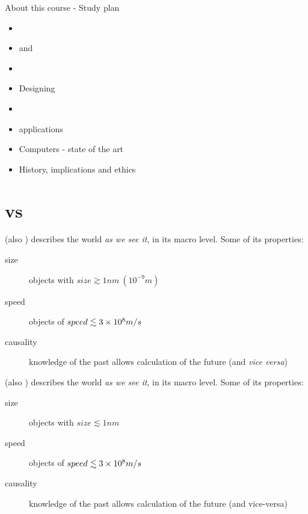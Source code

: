 \documentclass[aspectratio=43]{beamer}
\begin{document}
\begin{frame}{About this course - Study plan}
\begin{card}
    \begin{itemize}
        \item {}
        \item \qk and \ibmq
        \item \qi
        \item Designing \qcts
        \item \qa
        \item \qc applications
        \item \q Computers - state of the art
        \item History, implications and ethics
    \end{itemize}
\end{card}
\pagenumber
\end{frame}

\section{\qp vs \cp}

\begin{frame}{\cp}
\begin{card}
    \cp (also \cm) describes the world \textit{as we see it}, in its macro level. Some of its properties:
    \begin{description}
        \item[size] objects with $size \gtrsim 1nm\ (10^{-9}m)$
        \item[speed] objects of $speed \lesssim 3 \times 10^{8} m/s$
        \item[causality] knowledge of the past allows calculation of the future (and \textit{vice versa})
    \end{description}
\end{card}
\pagenumber
\end{frame}


\begin{frame}{\qp}
\begin{card}
    \qp (also \qm) describes the world \textit{as we see it}, in its macro level. Some of its properties:
    \begin{description}
        \item[size] objects with $size \lesssim 1nm$
        \item[speed] objects of $speed \lesssim 3 \times 10^{8} m/s$
        \item[causality] knowledge of the past allows calculation of the future (and vice-versa)
    \end{description}
\end{card}
\pagenumber
\end{frame}
\end{document}
